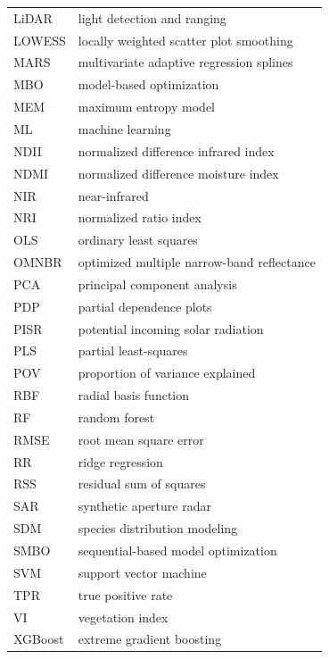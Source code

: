 \documentclass[remotesensing,article,submit,moreauthors,pdftex]{Definitions/mdpi}
\begin{document}
{\begin{tabular}{@{}ll}
		LiDAR   & light detection and ranging                             \\
		LOWESS  & locally weighted scatter plot smoothing                 \\
		MARS    & multivariate adaptive regression splines                \\
		MBO     & model-based optimization                                \\
		MEM     & maximum entropy model                                   \\
		ML      & machine learning                                        \\
		NDII    & normalized difference infrared index                    \\
		NDMI    & normalized difference moisture index                    \\
		NIR     & near-infrared                                           \\
		NRI     & normalized ratio index                                  \\
		OLS     & ordinary least squares                                  \\
		OMNBR   & optimized multiple narrow-band reflectance              \\
		PCA     & principal component analysis                            \\
		PDP     & partial dependence plots                                \\
		PISR    & potential incoming solar radiation                      \\
		PLS     & partial least-squares                                   \\
		POV     & proportion of variance explained                        \\
		RBF     & radial basis function                                   \\
		RF      & random forest                                           \\
		RMSE    & root mean square error                                  \\
		RR      & ridge regression                                        \\
		RSS     & residual sum of squares                                 \\
		SAR     & synthetic aperture radar                                \\
		SDM     & species distribution modeling                           \\
		SMBO    & sequential-based model optimization                     \\
		SVM     & support vector machine                                  \\
		TPR     & true positive rate                                      \\
		VI      & vegetation index                                        \\
		XGBoost & extreme gradient boosting
	\end{tabular}}
\end{document}
